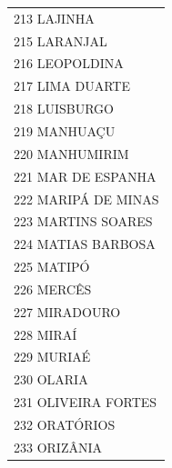 \documentclass{article}
\begin{document}
\begin{longtable}[c]{m{18cm}}
\multicolumn{1}{l}{ \hspace{2em} 213 LAJINHA } \\
\multicolumn{1}{l}{ \hspace{2em} 215 LARANJAL } \\
\multicolumn{1}{l}{ \hspace{2em} 216 LEOPOLDINA } \\
\multicolumn{1}{l}{ \hspace{2em} 217 LIMA DUARTE } \\
\multicolumn{1}{l}{ \hspace{2em} 218 LUISBURGO } \\
\multicolumn{1}{l}{ \hspace{2em} 219 MANHUAÇU } \\
\multicolumn{1}{l}{ \hspace{2em} 220 MANHUMIRIM } \\
\multicolumn{1}{l}{ \hspace{2em} 221 MAR DE ESPANHA } \\
\multicolumn{1}{l}{ \hspace{2em} 222 MARIPÁ DE MINAS } \\
\multicolumn{1}{l}{ \hspace{2em} 223 MARTINS SOARES } \\
\multicolumn{1}{l}{ \hspace{2em} 224 MATIAS BARBOSA } \\
\multicolumn{1}{l}{ \hspace{2em} 225 MATIPÓ } \\
\multicolumn{1}{l}{ \hspace{2em} 226 MERCÊS } \\
\multicolumn{1}{l}{ \hspace{2em} 227 MIRADOURO } \\
\multicolumn{1}{l}{ \hspace{2em} 228 MIRAÍ } \\
\multicolumn{1}{l}{ \hspace{2em} 229 MURIAÉ } \\
\multicolumn{1}{l}{ \hspace{2em} 230 OLARIA } \\
\multicolumn{1}{l}{ \hspace{2em} 231 OLIVEIRA FORTES } \\
\multicolumn{1}{l}{ \hspace{2em} 232 ORATÓRIOS } \\
\multicolumn{1}{l}{ \hspace{2em} 233 ORIZÂNIA } \\

\end{longtable}
\end{document}
